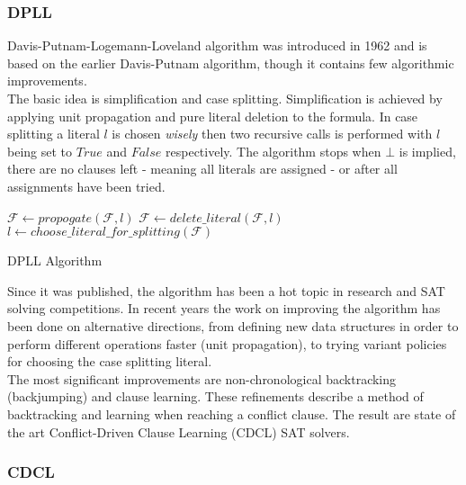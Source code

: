 \documentclass[]{article}
\begin{document}
	\subsubsection{DPLL}
	Davis-Putnam-Logemann-Loveland algorithm was introduced in 1962 and is based on the earlier Davis-Putnam algorithm, though it contains few algorithmic improvements. \\
	The basic idea is simplification and case splitting. Simplification is achieved by applying unit propagation and pure literal deletion to the formula. In case splitting a literal $ l $ is chosen \textit{wisely}\cite{BranchingH} then two recursive calls is performed with $ l $ being set to $ True $ and $ False $ respectively. The algorithm stops when $ \bot $ is implied, there are no clauses left - meaning all literals are assigned - or after all assignments have been tried.
	\\
	\begin{algorithm}[H]
		 {
			$ \mathcal{F} \leftarrow propogate(\mathcal{F}, l) $
		}
		 {
			$ \mathcal{F} \leftarrow delete\_literal(\mathcal{F}, l) $
		}
		$ l \leftarrow choose\_literal\_for\_splitting(\mathcal{F}) $ \\
	\caption{DPLL Algorithm}
	\end{algorithm}
	Since it was published, the algorithm has been a hot topic in research and SAT solving competitions. In recent years the work on improving the algorithm has been done on alternative directions, from defining new data structures in order to perform different operations faster (unit propagation), to trying variant policies for choosing the case splitting literal.\\ The most significant improvements are non-chronological backtracking (backjumping) and clause learning. These refinements describe a method of backtracking and learning when reaching a conflict clause. The result are state of the art Conflict-Driven Clause Learning (CDCL) SAT solvers.

	\subsubsection{CDCL}
	
	\pagebreak
\end{document}
